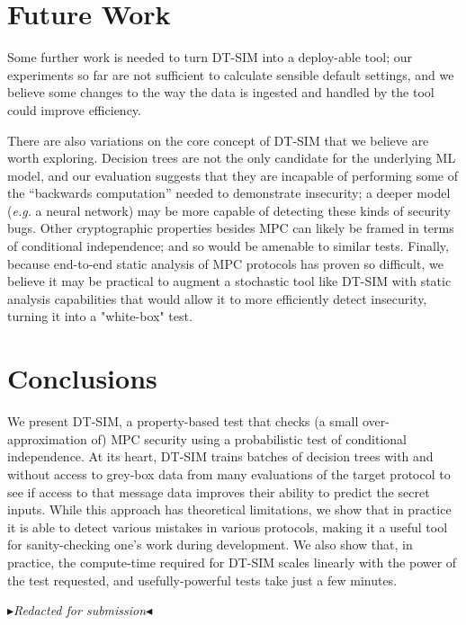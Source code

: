 \documentclass[acmlarge, manuscript, screen, review, anonymous, table]{acmart}
\newcommand{\eg}{\textit{e.g.}\xspace}
\newcommand{\toolname}{\textsc{DT-SIM}\xspace}
\newcommand{\mynote}[2]
    {{\color{red} \fbox{\bfseries\sffamily\scriptsize#1}
    {\small$\blacktriangleright$\textsf{\emph{#2}}$\blacktriangleleft$}}~}
\newcommand{\todo}[1]{\mynote{TODO}{#1}}
\begin{document}
\section{Future Work}

Some further work is needed to turn \toolname into a deploy-able tool;
our experiments so far are not sufficient to calculate sensible default settings,
and we believe some changes to the way the data is ingested and handled by the tool could improve efficiency.

There are also variations on the core concept of \toolname that we believe are worth exploring.
Decision trees are not the only candidate for the underlying ML model, and our evaluation suggests that they are incapable of performing some of the ``backwards computation'' needed to demonstrate insecurity;
a deeper model (\eg a neural network) may be more capable of detecting these kinds of security bugs.
Other cryptographic properties besides MPC can likely be framed in terms of conditional independence;
and so would be amenable to similar tests.
Finally, because end-to-end static analysis of MPC protocols has proven so difficult,
we believe it may be practical to augment a stochastic tool like \toolname with static analysis capabilities
that would allow it to more efficiently detect insecurity, turning it into a "white-box" test.


\section{Conclusions}

We present \toolname,
a property-based test that checks (a small over-approximation of) MPC security
using a probabilistic test of conditional independence.
At its heart, \toolname trains batches of decision trees with and without access to grey-box data from many evaluations of the target protocol
to see if access to that message data improves their ability to predict the secret inputs.
While this approach has theoretical limitations, we show that in practice it is able to detect various mistakes in various protocols,
making it a useful tool for sanity-checking one's work during development.
We also show that, in practice, the compute-time required for \toolname scales linearly with the power of the test requested,
and usefully-powerful tests take just a few minutes.

\begin{acks}
    \todo{Redacted for submission}
\end{acks}
\end{document}
